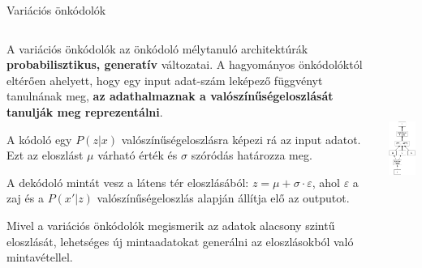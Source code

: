 \documentclass[english, aspectratio=169]{beamer}
\begin{document}
\begin{frame}{Variációs önkódolók}
	\begin{columns}
		\begin{column}{.7\textwidth}
			A variációs önkódolók az önkódoló mélytanuló architektúrák \textbf{probabilisztikus, generatív} változatai. A hagyományos önkódolóktól eltérően ahelyett, hogy egy input adat-szám leképező függvényt tanulnának meg, \textbf{az adathalmaznak a valószínűségeloszlását tanulják meg reprezentálni}.\par\smallskip
			A kódoló egy $P(z|x)$ valószínűségeloszlásra képezi rá az input adatot. Ezt az eloszlást $\mu$ várható érték és $\sigma$ szóródás határozza meg.\par\smallskip
			A dekódoló mintát vesz a látens tér eloszlásából: $z = \mu + \sigma \cdot \varepsilon$, ahol $\varepsilon$ a zaj és a $P(x'|z)$ valószínűségeloszlás alapján állítja elő az outputot.\par\smallskip
			Mivel a variációs önkódolók megismerik az adatok alacsony szintű eloszlását, lehetséges új mintaadatokat generálni az eloszlásokból való mintavétellel. 
		\end{column}
		\begin{column}{.3\textwidth}
			\begin{center}
				\includegraphics[height=7cm, keepaspectratio]{graphs/dl_6.png}
			\end{center}
		\end{column}
	\end{columns}
\end{frame}
\end{document}
